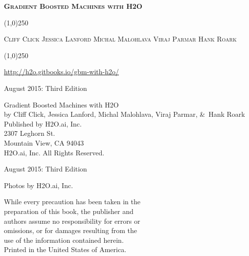 








\thispagestyle{empty} %


\begin{center}
\textsc{\Large\bf{Gradient Boosted Machines with H2O}}

\bigskip
\line(1,0){250}  %
\\
\bigskip

\textsc{\small{Cliff Click \hspace{20pt} Jessica Lanford \hspace{20pt} Michal Malohlava \hspace{20pt} Viraj Parmar \hspace{20pt} Hank Roark }}

\bigskip
\line(1,0){250}  %

{\url{http://h2o.gitbooks.io/gbm-with-h2o/}}

\bigskip
August 2015: Third Edition 
\\%
\bigskip
\end{center}

\null\vfill
\begin{figure}[!b]
\noindent{}
\end{figure}

\newpage
\restoregeometry

\null\vfill %

\thispagestyle{empty}%

{\raggedright 

Gradient Boosted Machines with H2O\\
  by Cliff Click, Jessica Lanford, Michal Malohlava, Viraj Parmar, \&\  Hank Roark\\
\bigskip
  Published by H2O.ai, Inc. \\
2307 Leghorn St. \\
Mountain View, CA 94043\\
\bigskip
{} H2O.ai, Inc. All Rights Reserved. 
\bigskip

August 2015: Third Edition
\bigskip

Photos by \textcopyright H2O.ai, Inc.
\bigskip

While every precaution has been taken in the\\
preparation of this book, the publisher and\\
authors assume no responsibility for errors or\\
omissions, or for damages resulting from the\\
use of the information contained herein.\\
\bigskip
Printed in the United States of America. 
}


